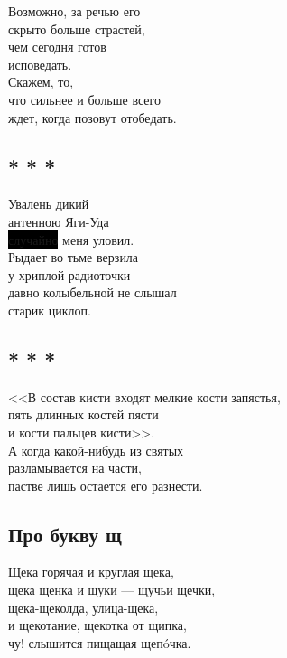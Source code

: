 \documentclass[12pt,a5paper]{report}
\newcommand{\hl}[1]{\colorbox{black}{#1}} %
\begin{document}
Возможно, за речью его \\
скрыто больше страстей, \\
чем сегодня готов \\
исповедать.\\

Скажем, то,\\
что сильнее и больше всего\\
ждет, когда позовут отобедать.\\
\newpage

\subsection[<<Увалень дикий...>>]{* * *}
Увалень дикий \\
антенною Яги-Уда \\
\hl{случайно} меня уловил. \\

Рыдает во тьме верзила \\
у хриплой радиоточки --- \\

давно колыбельной не слышал \\
старик циклоп.\\
\newpage

\subsection[<<В состав кисти...>>]{* * *}
<<В состав кисти входят мелкие кости запястья,\\
пять длинных костей пясти\\
и кости пальцев кисти>>.\\

А когда какой-нибудь из святых\\
разламывается на части,\\
пастве лишь остается его разнести.

\vspace{1.5cm}
\newpage



\subsection{Про букву щ}
Щека горячая и круглая щека,\\
щека щенка и щуки — щучьи щечки,\\
щека-щеколда, улица-щека,\\
и щекотание, щекотка от щипка,\\
чу! слышится пищащая щепóчка.\\
\end{document}
